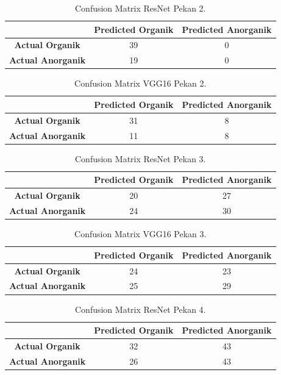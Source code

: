 \documentclass[12pt,a4paper]{article}
\begin{document}
\begin{table}[H]
\centering
\begin{tabular}{|c|c|c|}
    \hline
    & \textbf{Predicted Organik} & \textbf{Predicted Anorganik} \\
    \hline
    \textbf{Actual Organik} & 39 & 0 \\
    \hline
    \textbf{Actual Anorganik} & 19 & 0 \\
    \hline
\end{tabular}
\caption{Confusion Matrix ResNet Pekan 2.}
\end{table}

\begin{table}[H]
\centering
\begin{tabular}{|c|c|c|}
    \hline
    & \textbf{Predicted Organik} & \textbf{Predicted Anorganik} \\
    \hline
    \textbf{Actual Organik} & 31 & 8 \\
    \hline
    \textbf{Actual Anorganik} & 11 & 8 \\
    \hline
\end{tabular}
\caption{Confusion Matrix VGG16 Pekan 2.}
\end{table}


\begin{table}[H]
\centering
\begin{tabular}{|c|c|c|}
    \hline
    & \textbf{Predicted Organik} & \textbf{Predicted Anorganik} \\
    \hline
    \textbf{Actual Organik} & 20 & 27 \\
    \hline
    \textbf{Actual Anorganik} & 24 & 30 \\
    \hline
\end{tabular}
\caption{Confusion Matrix ResNet Pekan 3.}
\end{table}

\begin{table}[H]
\centering
\begin{tabular}{|c|c|c|}
    \hline
    & \textbf{Predicted Organik} & \textbf{Predicted Anorganik} \\
    \hline
    \textbf{Actual Organik} & 24 & 23 \\
    \hline
    \textbf{Actual Anorganik} & 25 & 29 \\
    \hline
\end{tabular}
\caption{Confusion Matrix VGG16 Pekan 3.}
\end{table}


\begin{table}[H]
\centering
\begin{tabular}{|c|c|c|}
    \hline
    & \textbf{Predicted Organik} & \textbf{Predicted Anorganik} \\
    \hline
    \textbf{Actual Organik} & 32 & 43 \\
    \hline
    \textbf{Actual Anorganik} & 26 & 43 \\
    \hline
\end{tabular}
\caption{Confusion Matrix ResNet Pekan 4.}
\end{table}
\end{document}
